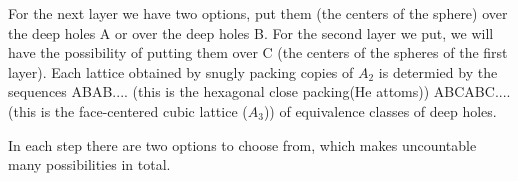 For the next layer we have two options, put them (the centers of the sphere) over the deep holes A or over the deep holes B. For the second layer we put, we will have the possibility of putting them over C (the centers of the spheres of the first layer).
Each lattice obtained by snugly packing copies of $A_2$ is determied by the sequences
ABAB.... (this is the hexagonal close packing(He attoms))
ABCABC....(this is the face-centered cubic lattice ($A_3$))
of equivalence classes of deep holes.

In each step there are two options to choose from, which makes uncountable many possibilities in total.


